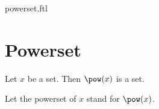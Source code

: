\documentclass{naproche-library}
\begin{document}
\begin{smodule}{powerset.ftl}

  \section{Powerset}

  \begin{axiom}[forthel,title=Powerset Axiom,id=FOUNDATIONS_10_5862230203564032]
    Let $x$ be a set.
    Then $\pow(x)$ is a set.

    Let the powerset of $x$ stand for $\pow(x)$.
  \end{axiom}
\end{smodule}
\end{document}
